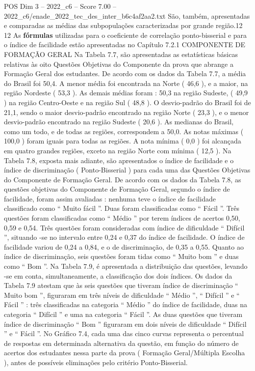 \begin{textsample}{POS Dim 3 – 2022\_c6 – Score 7.00 – 2022\_c6/enade\_2022\_tec\_des\_inter\_b6c4af2aa2.txt}
São, também, apresentadas e comparadas as médias das subpopulações caracterizadas por grande região.12 12 As \textbf{fórmulas} utilizadas para o coeficiente de correlação ponto-bisserial e para o índice de facilidade estão apresentadas no Capítulo 7.2.1 COMPONENTE DE FORMAÇÃO GERAL Na Tabela 7.7, são apresentadas as estatísticas básicas relativas às oito Questões Objetivas do Componente da prova que abrange a Formação Geral dos estudantes.
De acordo com os dados da Tabela 7.7, a média do Brasil foi 50,4.
A menor média foi encontrada na Norte ( 46,6 ), e a maior, na região Nordeste ( 53,3 ).
As demais médias foram : 50,3 na região Sudeste, ( 49,9 ) na região Centro-Oeste e na região Sul ( 48,8 ).
O desvio-padrão do Brasil foi de 21,1, sendo o maior desvio-padrão encontrado na região Norte ( 23,3 ), e o menor desvio-padrão encontrado na região Sudeste ( 20,6 ).
As medianas do Brasil, como um todo, e de todas as regiões, correspondem a 50,0.
As notas máximas ( 100,0 ) foram iguais para todas as regiões.
A nota mínima ( 0,0 ) foi alcançada em quatro grandes regiões, exceto na região Norte com mínima ( 12,5 ).
Na Tabela 7.8, exposta mais adiante, são apresentados o índice de facilidade e o índice de discriminação ( Ponto-Bisserial ) para cada uma das Questões Objetivas do Componente de Formação Geral.
De acordo com os dados da Tabela 7.8, as questões objetivas do Componente de Formação Geral, segundo o índice de facilidade, foram assim avaliadas : nenhuma teve o índice de facilidade classificado como “ Muito fácil ”.
Duas foram classificadas como “ Fácil ”.
Três questões foram classificadas como “ Médio ” por terem índices de acertos 0,50, 0,59 e 0,54.
Três questões foram consideradas com índice de dificuldade “ Difícil ”, situando -se no intervalo entre 0,24 e 0,37 do índice de facilidade.
O índice de facilidade variou de 0,24 a 0,84, e o de discriminação, de 0,35 a 0,55.
Quanto ao índice de discriminação, seis questões foram tidas como “ Muito bom ” e duas como “ Bom ”.
Na Tabela 7.9, é apresentada a distribuição das questões, levando -se em conta, simultaneamente, a classificação dos dois índices.
Os dados da Tabela 7.9 atestam que às seis questões que tiveram índice de discriminação “ Muito bom ”, figuraram em três níveis de dificuldade “ Médio ”, “ Difícil ” e “ Fácil ” : três classificadas na categoria “ Médio ” do índice de facilidade, duas na categoria “ Difícil ” e uma na categoria “ Fácil ”.
As duas questões que tiveram índice de discriminação “ Bom ” figuraram em dois níveis de dificuldade “ Difícil ” e “ Fácil ”.
No Gráfico 7.4, cada uma das cinco curvas representa o percentual de respostas em determinada alternativa da questão, em função do número de acertos dos estudantes nessa parte da prova ( Formação Geral/Múltipla Escolha ), antes de possíveis eliminações pelo critério Ponto-Bisserial.

\end{textsample}
